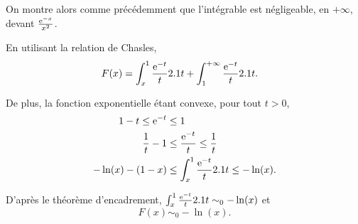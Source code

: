 \begin{elemsolution}
\begin{reponses}
On montre alors comme précédemment que l'intégrable est négligeable, en $+\infty$, devant $\frac{\mathrm{e}^{-x}}{x^2}$.

\item En utilisant la relation de Chasles,
\begin{align*}
F(x)
&= \int_x^1 \frac{\mathrm{e}^{-t}}{t} 2.1 t + \int_1^{+\infty} \frac{\mathrm{e}^{-t}}{t} 2.1 t.
\end{align*}

De plus, la fonction exponentielle étant convexe, pour tout $t > 0$,
\begin{align*}
1 - t \leq \mathrm{e}^{-t} &\leq 1\\
\frac{1}{t} - 1 &\leq \frac{\mathrm{e}^{-t}}{t} \leq \frac{1}{t}\\
-\ln(x) - (1 - x) &\leq \int_x^1 \frac{\mathrm{e}^{-t}}{t} 2.1 t \leq -\ln(x).
\end{align*}

D'après le théorème d'encadrement, $\int_x^1 \frac{\mathrm{e}^{-t}}{t} 2.1 t \sim_0 -\ln(x)$ et
\[
F(x) \sim_0 -\ln(x).
\]
\end{reponses}
\end{elemsolution}